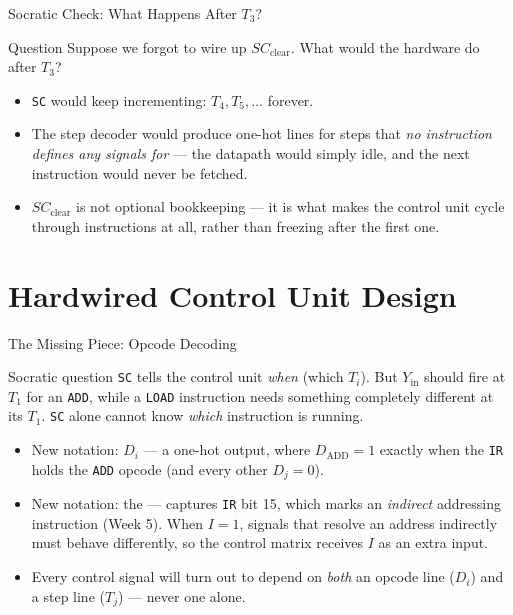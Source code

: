 \documentclass[aspectratio=169]{beamer}
\begin{document}
\begin{frame}{Socratic Check: What Happens After $T_3$?}
  \begin{alertblock}{Question}
    Suppose we forgot to wire up $SC_{\text{clear}}$. What would the hardware do after
    $T_3$?
  \end{alertblock}
  \begin{itemize}
    \item \texttt{SC} would keep incrementing: $T_4, T_5, \dots$ forever.
    \item The step decoder would produce one-hot lines for steps that
      \emph{no instruction defines any signals for} --- the datapath would simply
      idle, and the next instruction would never be fetched.
    \item $SC_{\text{clear}}$ is not optional bookkeeping --- it is what makes the control
      unit cycle through instructions at all, rather than freezing after the first
      one.
  \end{itemize}
\end{frame}


\section{Hardwired Control Unit Design}

\begin{frame}{The Missing Piece: Opcode Decoding}
  \begin{block}{Socratic question}
    \texttt{SC} tells the control unit \emph{when} (which $T_i$). But
    $Y_{\text{in}}$ should fire at $T_1$ for an \texttt{ADD}, while a \texttt{LOAD}
    instruction needs something completely different at its $T_1$. \texttt{SC}
    alone cannot know \emph{which} instruction is running.
  \end{block}
  \begin{itemize}
    \item New notation: $D_i$ --- a one-hot  output, where
      $D_{\text{ADD}} = 1$ exactly when the \texttt{IR} holds the \texttt{ADD}
      opcode (and every other $D_j = 0$).
    \item New notation: the  --- captures \texttt{IR} bit 15,
      which marks an \emph{indirect} addressing instruction (Week 5). When
      $I = 1$, signals that resolve an address indirectly must behave
      differently, so the control matrix receives $I$ as an extra input.
    \item Every control signal will turn out to depend on \emph{both} an opcode
      line ($D_i$) and a step line ($T_j$) --- never one alone.
  \end{itemize}
\end{frame}
\end{document}
